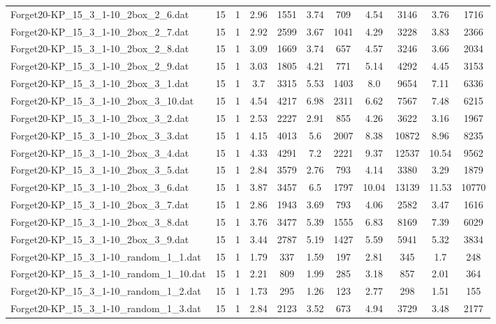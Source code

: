 \begin{table}[!ht]
\begin{tabular}{lcccccccccc}
Forget20-KP\_15\_3\_1-10\_2box\_2\_6.dat & 15 & 1 & 2.96 & 1551 & 3.74 & 709 & 4.54 & 3146 & 3.76 & 1716 \\
Forget20-KP\_15\_3\_1-10\_2box\_2\_7.dat & 15 & 1 & 2.92 & 2599 & 3.67 & 1041 & 4.29 & 3228 & 3.83 & 2366 \\
Forget20-KP\_15\_3\_1-10\_2box\_2\_8.dat & 15 & 1 & 3.09 & 1669 & 3.74 & 657 & 4.57 & 3246 & 3.66 & 2034 \\
Forget20-KP\_15\_3\_1-10\_2box\_2\_9.dat & 15 & 1 & 3.03 & 1805 & 4.21 & 771 & 5.14 & 4292 & 4.45 & 3153 \\
Forget20-KP\_15\_3\_1-10\_2box\_3\_1.dat & 15 & 1 & 3.7 & 3315 & 5.53 & 1403 & 8.0 & 9654 & 7.11 & 6336 \\
Forget20-KP\_15\_3\_1-10\_2box\_3\_10.dat & 15 & 1 & 4.54 & 4217 & 6.98 & 2311 & 6.62 & 7567 & 7.48 & 6215 \\
Forget20-KP\_15\_3\_1-10\_2box\_3\_2.dat & 15 & 1 & 2.53 & 2227 & 2.91 & 855 & 4.26 & 3622 & 3.16 & 1967 \\
Forget20-KP\_15\_3\_1-10\_2box\_3\_3.dat & 15 & 1 & 4.15 & 4013 & 5.6 & 2007 & 8.38 & 10872 & 8.96 & 8235 \\
Forget20-KP\_15\_3\_1-10\_2box\_3\_4.dat & 15 & 1 & 4.33 & 4291 & 7.2 & 2221 & 9.37 & 12537 & 10.54 & 9562 \\
Forget20-KP\_15\_3\_1-10\_2box\_3\_5.dat & 15 & 1 & 2.84 & 3579 & 2.76 & 793 & 4.14 & 3380 & 3.29 & 1879 \\
Forget20-KP\_15\_3\_1-10\_2box\_3\_6.dat & 15 & 1 & 3.87 & 3457 & 6.5 & 1797 & 10.04 & 13139 & 11.53 & 10770 \\
Forget20-KP\_15\_3\_1-10\_2box\_3\_7.dat & 15 & 1 & 2.86 & 1943 & 3.69 & 793 & 4.06 & 2582 & 3.47 & 1616 \\
Forget20-KP\_15\_3\_1-10\_2box\_3\_8.dat & 15 & 1 & 3.76 & 3477 & 5.39 & 1555 & 6.83 & 8169 & 7.39 & 6029 \\
Forget20-KP\_15\_3\_1-10\_2box\_3\_9.dat & 15 & 1 & 3.44 & 2787 & 5.19 & 1427 & 5.59 & 5941 & 5.32 & 3834 \\
Forget20-KP\_15\_3\_1-10\_random\_1\_1.dat & 15 & 1 & 1.79 & 337 & 1.59 & 197 & 2.81 & 345 & 1.7 & 248 \\
Forget20-KP\_15\_3\_1-10\_random\_1\_10.dat & 15 & 1 & 2.21 & 809 & 1.99 & 285 & 3.18 & 857 & 2.01 & 364 \\
Forget20-KP\_15\_3\_1-10\_random\_1\_2.dat & 15 & 1 & 1.73 & 295 & 1.26 & 123 & 2.77 & 298 & 1.51 & 155 \\
Forget20-KP\_15\_3\_1-10\_random\_1\_3.dat & 15 & 1 & 2.84 & 2123 & 3.52 & 673 & 4.94 & 3729 & 3.48 & 2177 \\

\end{tabular}
\end{table}
